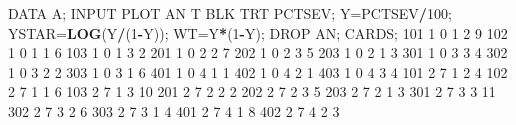 \documentclass[]{book}
\newenvironment{Shaded}{\begin{snugshade}}{\end{snugshade}}
\newcommand{\DecValTok}[1]{\textcolor[rgb]{0.00,0.00,0.81}{#1}}
\newcommand{\KeywordTok}[1]{\textcolor[rgb]{0.13,0.29,0.53}{\textbf{#1}}}
\newcommand{\NormalTok}[1]{#1}
\newcommand{\OperatorTok}[1]{\textcolor[rgb]{0.81,0.36,0.00}{\textbf{#1}}}
\begin{document}
\begin{Shaded}
\begin{Highlighting}[]
\NormalTok{DATA A;}
\NormalTok{INPUT PLOT AN T BLK TRT PCTSEV;}
\NormalTok{Y=PCTSEV}\OperatorTok{/}\DecValTok{100}\NormalTok{;}
\NormalTok{YSTAR=}\KeywordTok{LOG}\NormalTok{(Y}\OperatorTok{/}\NormalTok{(}\DecValTok{1}\OperatorTok{-}\NormalTok{Y));}
\NormalTok{WT=Y}\OperatorTok{*}\NormalTok{(}\DecValTok{1}\OperatorTok{-}\NormalTok{Y);}
\NormalTok{DROP AN;}
\NormalTok{CARDS;}
\DecValTok{101} \DecValTok{1}   \DecValTok{0}   \DecValTok{1}   \DecValTok{2}   \DecValTok{9}
\DecValTok{102} \DecValTok{1}   \DecValTok{0}   \DecValTok{1}   \DecValTok{1}   \DecValTok{6}
\DecValTok{103} \DecValTok{1}   \DecValTok{0}   \DecValTok{1}   \DecValTok{3}   \DecValTok{2}
\DecValTok{201} \DecValTok{1}   \DecValTok{0}   \DecValTok{2}   \DecValTok{2}   \DecValTok{7}
\DecValTok{202} \DecValTok{1}   \DecValTok{0}   \DecValTok{2}   \DecValTok{3}   \DecValTok{5}
\DecValTok{203} \DecValTok{1}   \DecValTok{0}   \DecValTok{2}   \DecValTok{1}   \DecValTok{3}
\DecValTok{301} \DecValTok{1}   \DecValTok{0}   \DecValTok{3}   \DecValTok{3}   \DecValTok{4}
\DecValTok{302} \DecValTok{1}   \DecValTok{0}   \DecValTok{3}   \DecValTok{2}   \DecValTok{2}
\DecValTok{303} \DecValTok{1}   \DecValTok{0}   \DecValTok{3}   \DecValTok{1}   \DecValTok{6}
\DecValTok{401} \DecValTok{1}   \DecValTok{0}   \DecValTok{4}   \DecValTok{1}   \DecValTok{1}
\DecValTok{402} \DecValTok{1}   \DecValTok{0}   \DecValTok{4}   \DecValTok{2}   \DecValTok{1}
\DecValTok{403} \DecValTok{1}   \DecValTok{0}   \DecValTok{4}   \DecValTok{3}   \DecValTok{4}
\DecValTok{101} \DecValTok{2}   \DecValTok{7}   \DecValTok{1}   \DecValTok{2}   \DecValTok{4}
\DecValTok{102} \DecValTok{2}   \DecValTok{7}   \DecValTok{1}   \DecValTok{1}   \DecValTok{6}
\DecValTok{103} \DecValTok{2}   \DecValTok{7}   \DecValTok{1}   \DecValTok{3}   \DecValTok{10}
\DecValTok{201} \DecValTok{2}   \DecValTok{7}   \DecValTok{2}   \DecValTok{2}   \DecValTok{2}
\DecValTok{202} \DecValTok{2}   \DecValTok{7}   \DecValTok{2}   \DecValTok{3}   \DecValTok{5}
\DecValTok{203} \DecValTok{2}   \DecValTok{7}   \DecValTok{2}   \DecValTok{1}   \DecValTok{3}
\DecValTok{301} \DecValTok{2}   \DecValTok{7}   \DecValTok{3}   \DecValTok{3}   \DecValTok{11}
\DecValTok{302} \DecValTok{2}   \DecValTok{7}   \DecValTok{3}   \DecValTok{2}   \DecValTok{6}
\DecValTok{303} \DecValTok{2}   \DecValTok{7}   \DecValTok{3}   \DecValTok{1}   \DecValTok{4}
\DecValTok{401} \DecValTok{2}   \DecValTok{7}   \DecValTok{4}   \DecValTok{1}   \DecValTok{8}
\DecValTok{402} \DecValTok{2}   \DecValTok{7}   \DecValTok{4}   \DecValTok{2}   \DecValTok{3}

\end{Highlighting}
\end{Shaded}
\end{document}

